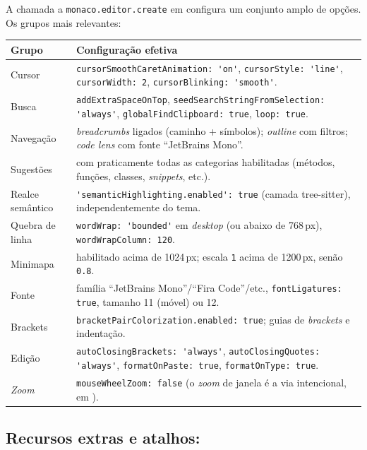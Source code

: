 A chamada a \lstinline|monaco.editor.create| em 
configura um conjunto amplo de opções. Os grupos mais relevantes:

\begin{tabularx}{\linewidth}{Y Y}
\toprule
\textbf{Grupo} & \textbf{Configuração efetiva} \\
\midrule
Cursor & \lstinline|cursorSmoothCaretAnimation: 'on'|, \lstinline|cursorStyle: 'line'|, \lstinline|cursorWidth: 2|, \lstinline|cursorBlinking: 'smooth'|. \\
Busca & \lstinline|addExtraSpaceOnTop|, \lstinline|seedSearchStringFromSelection: 'always'|, \lstinline|globalFindClipboard: true|, \lstinline|loop: true|. \\
Navegação & \emph{breadcrumbs} ligados (caminho + símbolos); \emph{outline} com filtros; \emph{code lens} com fonte \enquote{JetBrains Mono}. \\
Sugestões &  com praticamente todas as categorias habilitadas (métodos, funções, classes, \emph{snippets}, etc.). \\
Realce semântico & \lstinline|'semanticHighlighting.enabled': true| (camada tree-sitter), independentemente do tema. \\
Quebra de linha & \lstinline|wordWrap: 'bounded'| em \emph{desktop} (ou  abaixo de 768\,px), \lstinline|wordWrapColumn: 120|. \\
Minimapa & habilitado acima de 1024\,px; escala \lstinline|1| acima de 1200\,px, senão \lstinline|0.8|. \\
Fonte & família \enquote{JetBrains Mono}/\enquote{Fira Code}/etc., \lstinline|fontLigatures: true|, tamanho 11 (móvel) ou 12. \\
Brackets & \lstinline|bracketPairColorization.enabled: true|; guias de \emph{brackets} e indentação. \\
Edição & \lstinline|autoClosingBrackets: 'always'|, \lstinline|autoClosingQuotes: 'always'|, \lstinline|formatOnPaste: true|, \lstinline|formatOnType: true|. \\
\emph{Zoom} & \lstinline|mouseWheelZoom: false| (o \emph{zoom} de janela é a via intencional, em ). \\
\bottomrule
\end{tabularx}

\subsection{Recursos extras e atalhos: }
\label{sec:editor-enhanced}

